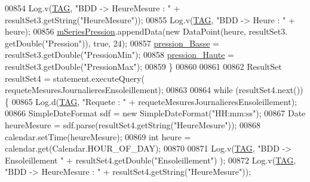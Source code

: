 \begin{DoxyCode}
00854                             Log.v(\hyperlink{classfr_1_1campus_1_1laurainc_1_1honeybee_1_1_ruche_a44739cbb0fa7451c1edc240a3f51c257}{TAG}, \textcolor{stringliteral}{"BDD -> HeureMesure : "} + resultSet3.getString(\textcolor{stringliteral}{"HeureMesure"}));
00855                             Log.v(\hyperlink{classfr_1_1campus_1_1laurainc_1_1honeybee_1_1_ruche_a44739cbb0fa7451c1edc240a3f51c257}{TAG}, \textcolor{stringliteral}{"BDD -> Heure : "} + heure);
00856                             \hyperlink{classfr_1_1campus_1_1laurainc_1_1honeybee_1_1_ruche_ab042d6976e773befe0f4beab70951a52}{mSeriesPression}.appendData(\textcolor{keyword}{new} DataPoint(heure, resultSet3.
      getDouble(\textcolor{stringliteral}{"Pression"})), \textcolor{keyword}{true}, 24);
00857                             \hyperlink{classfr_1_1campus_1_1laurainc_1_1honeybee_1_1_ruche_a195271425f165de0607902f1c76a235a}{pression\_Basse} = resultSet3.getDouble(\textcolor{stringliteral}{"PressionMin"});
00858                             \hyperlink{classfr_1_1campus_1_1laurainc_1_1honeybee_1_1_ruche_a5218589d82413783a85b71a8f765e565}{pression\_Haute} = resultSet3.getDouble(\textcolor{stringliteral}{"PressionMax"});
00859                         \}
00860 
00861 
00862                         ResultSet resultSet4 = statement.executeQuery(
      requeteMesuresJournalieresEnsoleillement);
00863 
00864                         \textcolor{keywordflow}{while} (resultSet4.next()) \{
00865                             Log.d(\hyperlink{classfr_1_1campus_1_1laurainc_1_1honeybee_1_1_ruche_a44739cbb0fa7451c1edc240a3f51c257}{TAG}, \textcolor{stringliteral}{"Requete : "} + requeteMesuresJournalieresEnsoleillement);
00866                             SimpleDateFormat sdf = \textcolor{keyword}{new} SimpleDateFormat(\textcolor{stringliteral}{"HH:mm:ss"});
00867                             Date heureMesure = sdf.parse(resultSet4.getString(\textcolor{stringliteral}{"HeureMesure"}));
00868                             calendar.setTime(heureMesure);
00869                             \textcolor{keywordtype}{int} heure = calendar.get(Calendar.HOUR\_OF\_DAY);
00870 
00871                             Log.v(\hyperlink{classfr_1_1campus_1_1laurainc_1_1honeybee_1_1_ruche_a44739cbb0fa7451c1edc240a3f51c257}{TAG}, \textcolor{stringliteral}{"BDD -> Ensoleillement "} + resultSet4.getDouble(\textcolor{stringliteral}{"Ensoleillement"})
      );
00872                             Log.v(\hyperlink{classfr_1_1campus_1_1laurainc_1_1honeybee_1_1_ruche_a44739cbb0fa7451c1edc240a3f51c257}{TAG}, \textcolor{stringliteral}{"BDD -> HeureMesure : "} + resultSet4.getString(\textcolor{stringliteral}{"HeureMesure"}));

\end{DoxyCode}
